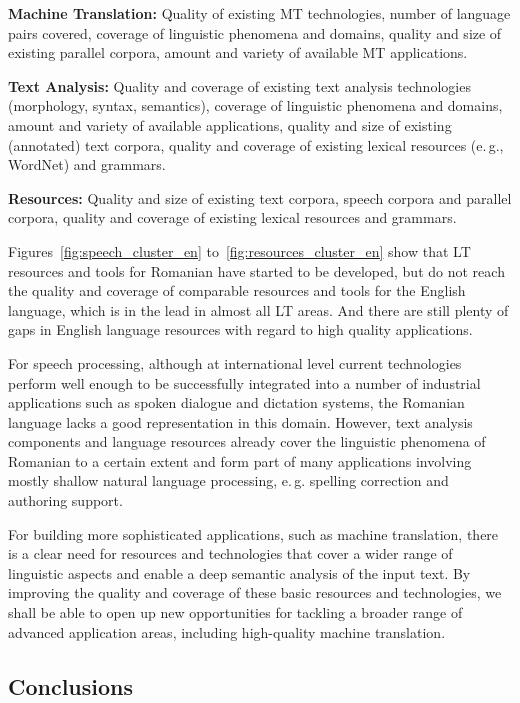 \begin{multicols}{2}
\textbf{Machine Translation:} Quality of existing MT technologies, number of language pairs covered, coverage of linguistic phenomena and domains, quality and size of existing parallel corpora, amount and variety of available MT applications.

\textbf{Text Analysis:} Quality and coverage of existing text analysis technologies (morphology, syntax, semantics), coverage of linguistic phenomena and domains, amount and variety of available applications, quality and size of existing (annotated) text corpora, quality and coverage of existing lexical resources (e.\,g., WordNet) and grammars.

\textbf{Resources:} Quality and size of existing text corpora, speech corpora and parallel corpora, quality and coverage of existing lexical resources and grammars.

Figures~\ref{fig:speech_cluster_en} to~\ref{fig:resources_cluster_en} show that LT resources and tools for Romanian have started to be developed, but do not reach the quality and coverage of comparable resources and tools for the English language, which is in the lead in almost all LT areas. And there are still plenty of gaps in English language resources with regard to high quality applications.

For speech processing, although at international level current technologies perform well enough to be successfully integrated into a number of industrial applications such as spoken dialogue and dictation systems, the Romanian language lacks a good representation in this domain. However, text analysis components and language resources already cover the linguistic phenomena of Romanian to a certain extent and form part of many applications involving mostly shallow natural language processing, e.\,g. spelling correction and authoring support.

For building more sophisticated applications, such as machine translation, there is a clear need for resources and technologies that cover a wider range of linguistic aspects and enable a deep semantic analysis of the input text. By improving the quality and coverage of these basic resources and technologies, we shall be able to open up new opportunities for tackling a broader range of advanced application areas, including high-quality machine translation.

\subsection{Conclusions}


\end{multicols}
